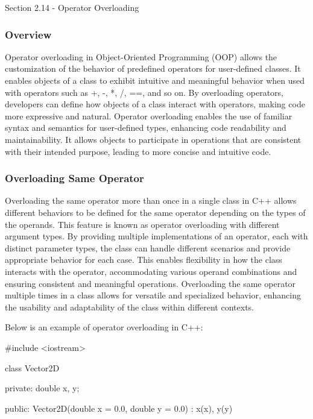 \begin{notes}{Section 2.14 - Operator Overloading}
    \subsubsection*{Overview}

    Operator overloading in Object-Oriented Programming (OOP) allows the customization of the behavior of predefined operators for user-defined classes. It enables objects of a class to exhibit intuitive and meaningful behavior when used with operators such as +, -, *, /, ==, and so on. By overloading operators, 
    developers can define how objects of a class interact with operators, making code more expressive and natural. Operator overloading enables the use of familiar syntax and semantics for user-defined types, enhancing code readability and maintainability. It allows objects to participate in operations that are 
    consistent with their intended purpose, leading to more concise and intuitive code.
    
    \subsubsection*{Overloading Same Operator}
    
    Overloading the same operator more than once in a single class in C++ allows different behaviors to be defined for the same operator depending on the types of the operands. This feature is known as operator overloading with different argument types. By providing multiple implementations of an operator, each 
    with distinct parameter types, the class can handle different scenarios and provide appropriate behavior for each case. This enables flexibility in how the class interacts with the operator, accommodating various operand combinations and ensuring consistent and meaningful operations. Overloading the same operator 
    multiple times in a class allows for versatile and specialized behavior, enhancing the usability and adaptability of the class within different contexts.
    
    \begin{highlight}
        Below is an example of operator overloading in C++:
    \begin{code}[C++]
    #include <iostream>
    
    class Vector2D {
    private:
        double x, y;
    
    public:
        Vector2D(double x = 0.0, double y = 0.0) : x(x), y(y) {}
    
}
\end{code}
\end{highlight}
\end{notes}
